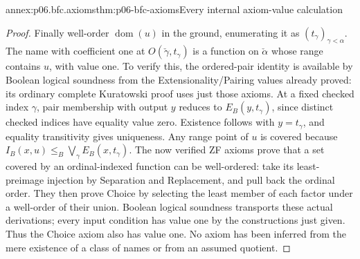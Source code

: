 \begin{annexitem}{annex:p06.bfc.axioms}{thm:p06-bfc-axioms}{Every internal axiom-value calculation}
\begin{proof}
Finally well-order \(\operatorname{dom}(u)\) in the ground, enumerating
it as \((t_\gamma)_{\gamma<\alpha}\). The name with coefficient one
at \(O(\check\gamma,t_\gamma)\) is a function on \(\check\alpha\)
whose range contains \(u\), with value one. To verify this, the
ordered-pair identity is available by Boolean logical soundness from
the Extensionality/Pairing values already proved: its ordinary complete
Kuratowski proof uses just those axioms. At a fixed checked index
\(\gamma\), pair membership with output \(y\) reduces to
\(E_B(y,t_\gamma)\), since distinct checked indices have equality value
zero. Existence follows with \(y=t_\gamma\), and equality transitivity
gives uniqueness. Any range point of \(u\) is covered because
\(I_B(x,u)\leq_B\bigvee_\gamma E_B(x,t_\gamma)\).
The now verified ZF axioms prove that a set covered by an ordinal-indexed
function can be well-ordered: take its least-preimage injection by Separation
and Replacement, and pull back the ordinal order. They then prove Choice
by selecting the least member of each factor under a well-order of their
union. Boolean logical soundness transports these actual derivations;
every input condition has value one by the constructions just given.
Thus the Choice axiom also has value one. No axiom has been inferred
from the mere existence of a class of names or from an assumed quotient.
\end{proof}
\end{annexitem}


